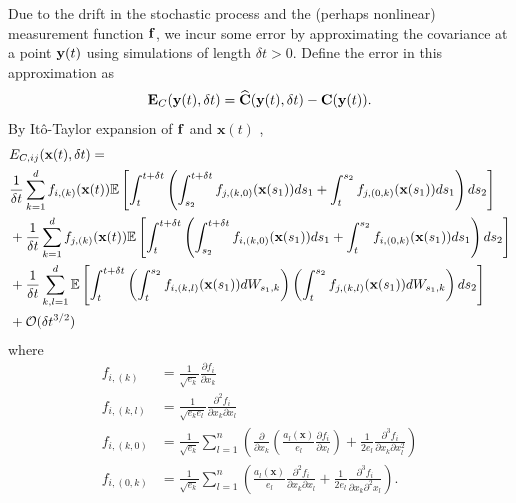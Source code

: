 Due to the drift in the stochastic process and the (perhaps nonlinear) measurement function $\mathbf{f}$, we incur some error by approximating the covariance at a point $\mathbf{y}(t)$ using simulations of length $\delta t > 0$.
%
Define the error in this approximation as
\begin{equation}
\mathbf{E}_C(\mathbf{y}(t), \delta t) = \widehat{\mathbf{C}}(\mathbf{y}(t), \delta t) - \mathbf{C}(\mathbf{y}(t)).
\end{equation}
%
%
By It\^{o}-Taylor expansion of $\mathbf{f}$ and $\mathbf{x}(t)$ \cite{kloeden1992numerical},
%
\begin{equation} \label{eq:cov_error}
\begin{aligned}
& E_{C, ij} (\mathbf{x}(t), \delta t) = \\
 & \frac{1}{\delta t} \sum_{k=1}^d f_{i,(k)}(\mathbf{x}(t)) \mathbb{E} \left[ \int_t^{t+\delta t} \left( \int_{s_2}^{t+\delta t} f_{j,(k,0)}(\mathbf{x}(s_1)) ds_1
+ \int_t^{s_2} f_{j,(0,k)}(\mathbf{x}(s_1)) ds_1 \right) ds_2 \right] \\
&+  \frac{1}{\delta t} \sum_{k=1}^d f_{j,(k)}(\mathbf{x}(t))  \mathbb{E} \left[ \int_t^{t+\delta t} \left( \int_{s_2}^{t + \delta t} f_{i,(k,0)}(\mathbf{x}(s_1)) ds_1
+  \int_t^{s_2} f_{i,(0,k)}(\mathbf{x}(s_1)) ds_1 \right) ds_2 \right] \\
&+  \frac{1}{\delta t} \sum_{k,l=1}^d \mathbb{E} \left[ \int_t^{t+\delta t}\left( \int_t^{s_2} f_{i,(k,l)}(\mathbf{x}(s_1)) dW_{s_1, k}  \right) \left(  \int_t^{s_2} f_{j,(k,l)}(\mathbf{x}(s_1)) dW_{s_1, k} \right) ds_2 \right] \\
&+ \mathcal{O} (\delta t^{3/2})
\end{aligned}
\end{equation}
%
where
\begin{equation}
\begin{aligned}
f_{i,(k)} &= \frac{1}{\sqrt{e_k}} \frac{\partial f_i}{\partial x_k}
\\
f_{i,(k,l)} &= \frac{1}{\sqrt{e_k e_l}} \frac{\partial^2 f_i}{\partial x_k \partial x_l}
\\
f_{i,(k,0)} &= \frac{1}{\sqrt{e_k}} \sum_{l=1}^n \left( \frac{\partial}{\partial x_k} \left( \frac{a_l(\mathbf{x})}{e_l} \frac{\partial f_i}{\partial x_l} \right) + \frac{1}{2 e_l} \frac{\partial^3 f_i}{\partial x_k \partial x_l^2} \right)
\\
f_{i,(0, k)} &= \frac{1}{\sqrt{e_k}} \sum_{l=1}^n \left( \frac{a_l(\mathbf{x})}{e_l} \frac{\partial^2 f_i}{\partial x_k \partial x_l} +\frac{1}{2 e_l}  \frac{\partial^3 f_i}{\partial x_k \partial^2 x_l} \right).
\end{aligned}
\end{equation}
